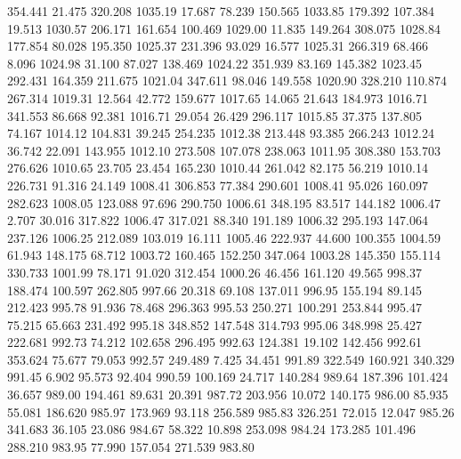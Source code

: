  354.441   21.475  320.208      1035.19
  17.687   78.239  150.565      1033.85
 179.392  107.384   19.513      1030.57
 206.171  161.654  100.469      1029.00
  11.835  149.264  308.075      1028.84
 177.854   80.028  195.350      1025.37
 231.396   93.029   16.577      1025.31
 266.319   68.466    8.096      1024.98
  31.100   87.027  138.469      1024.22
 351.939   83.169  145.382      1023.45
 292.431  164.359  211.675      1021.04
 347.611   98.046  149.558      1020.90
 328.210  110.874  267.314      1019.31
  12.564   42.772  159.677      1017.65
  14.065   21.643  184.973      1016.71
 341.553   86.668   92.381      1016.71
  29.054   26.429  296.117      1015.85
  37.375  137.805   74.167      1014.12
 104.831   39.245  254.235      1012.38
 213.448   93.385  266.243      1012.24
  36.742   22.091  143.955      1012.10
 273.508  107.078  238.063      1011.95
 308.380  153.703  276.626      1010.65
  23.705   23.454  165.230      1010.44
 261.042   82.175   56.219      1010.14
 226.731   91.316   24.149      1008.41
 306.853   77.384  290.601      1008.41
  95.026  160.097  282.623      1008.05
 123.088   97.696  290.750      1006.61
 348.195   83.517  144.182      1006.47
   2.707   30.016  317.822      1006.47
 317.021   88.340  191.189      1006.32
 295.193  147.064  237.126      1006.25
 212.089  103.019   16.111      1005.46
 222.937   44.600  100.355      1004.59
  61.943  148.175   68.712      1003.72
 160.465  152.250  347.064      1003.28
 145.350  155.114  330.733      1001.99
  78.171   91.020  312.454      1000.26
  46.456  161.120   49.565       998.37
 188.474  100.597  262.805       997.66
  20.318   69.108  137.011       996.95
 155.194   89.145  212.423       995.78
  91.936   78.468  296.363       995.53
 250.271  100.291  253.844       995.47
  75.215   65.663  231.492       995.18
 348.852  147.548  314.793       995.06
 348.998   25.427  222.681       992.73
  74.212  102.658  296.495       992.63
 124.381   19.102  142.456       992.61
 353.624   75.677   79.053       992.57
 249.489    7.425   34.451       991.89
 322.549  160.921  340.329       991.45
   6.902   95.573   92.404       990.59
 100.169   24.717  140.284       989.64
 187.396  101.424   36.657       989.00
 194.461   89.631   20.391       987.72
 203.956   10.072  140.175       986.00
  85.935   55.081  186.620       985.97
 173.969   93.118  256.589       985.83
 326.251   72.015   12.047       985.26
 341.683   36.105   23.086       984.67
  58.322   10.898  253.098       984.24
 173.285  101.496  288.210       983.95
  77.990  157.054  271.539       983.80
